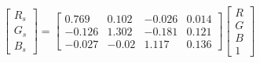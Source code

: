\begin{equation}
\begin{bmatrix}
  R_s \\ G_s \\ B_s 
\end{bmatrix}=
\left[\begin{matrix}0.769 & 0.102 & -0.026 & 0.014\\ 
-0.126 & 1.302 & -0.181 & 0.121\\ 
-0.027 & -0.02 & 1.117 & 0.136\end{matrix}\right]
\begin{bmatrix}
  R \\ G \\ B \\ 1 
\end{bmatrix}
\end{equation}
